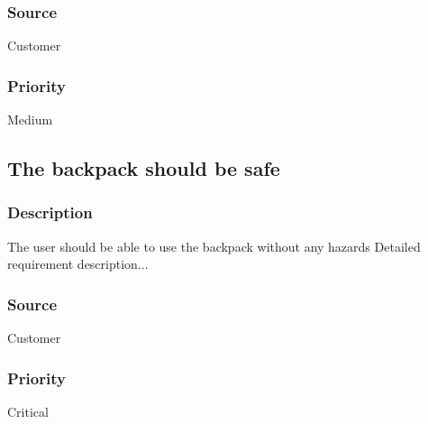 \subsubsection{Source}
Customer
\subsubsection{Priority}
Medium

\subsection{The backpack should be safe}
\subsubsection{Description}
The user should be able to use the backpack without any hazards
Detailed requirement description...
\subsubsection{Source} 
Customer
\subsubsection{Priority}
Critical
